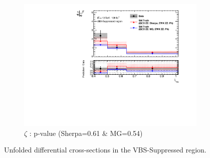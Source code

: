 \begin{figure}[!htb]
\begin{subfigure}{.49\textwidth}
        \includegraphics[width=.98\linewidth]{figures/Results/CrossSection_VBSSuppressed/xs_centrality_CR.pdf}
        \caption{ \footnotesize{$\zeta$ }: p-value (Sherpa=0.61 $\&$ MG=0.54)}
    \end{subfigure}
    \caption{Unfolded differential cross-sections in the VBS-Suppressed region.}  \label{fig:unfolded_xs_VBS_Suppressed_b}
\end{figure}